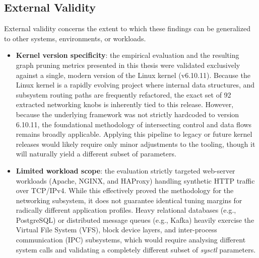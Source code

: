 \subsection{External Validity}

External validity concerns the extent to which these findings can be generalized to other systems, environments, or workloads.
\begin{itemize}
    \item \textbf{Kernel version specificity}: the empirical evaluation and the resulting graph pruning metrics presented in this thesis were validated exclusively against a single, modern version of the Linux kernel (v6.10.11). Because the Linux kernel is a rapidly evolving project where internal data structures, and subsystem routing paths are frequently refactored, the exact set of 92 extracted networking knobs is inherently tied to this release. However, because the underlying framework was not strictly hardcoded to version 6.10.11, the foundational methodology of intersecting control and data flows remains broadly applicable. Applying this pipeline to legacy or future kernel releases would likely require only minor adjustments to the tooling, though it will naturally yield a different subset of parameters.
    \item \textbf{Limited workload scope}: the evaluation strictly targeted web-server workloads (Apache, NGINX, and HAProxy) handling synthetic HTTP traffic over TCP/IPv4. While this effectively proved the methodology for the networking subsystem, it does not guarantee identical tuning margins for radically different application profiles. Heavy relational databases (e.g., PostgreSQL) or distributed message queues (e.g., Kafka) heavily exercise the Virtual File System (VFS), block device layers, and inter-process communication (IPC) subsystems, which would require analysing different system calls and validating a completely different subset of \textit{sysctl} parameters.
\end{itemize}

\newpage
